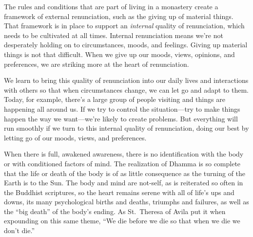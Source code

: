 The rules and conditions that are part of living in a monastery create 
a framework of external renunciation, such as the giving up of material 
things. That framework is in place to support an \emph{internal} 
quality of renunciation, which needs to be cultivated at all times. 
Internal renunciation means we're not desperately holding on to 
circumstances, moods, and feelings. Giving up material things is not 
that difficult. When we give up our moods, views, opinions, and 
preferences, we are striking more at the heart of renunciation.

We learn to bring this quality of renunciation into our daily lives and 
interactions with others so that when circumstances change, we can let 
go and adapt to them. Today, for example, there's a large group of 
people visiting and things are happening all around us. If we try to 
control the situation---try to make things happen the way we 
want---we're likely to create problems. But everything will run 
smoothly if we turn to this internal quality of renunciation, doing our 
best by letting go of our moods, views, and preferences.


When there is full, awakened awareness, there is no identification with 
the body or with conditioned factors of mind. The realization of Dhamma 
is so complete that the life or death of the body is of as little 
consequence as the turning of the Earth is to the Sun. The body and 
mind are not-self, as is reiterated so often in the Buddhist 
scriptures, so the heart remains serene with all of life's ups and 
downs, its many psychological births and deaths, triumphs and failures, 
as well as the ``big death'' of the body's ending. As St. Theresa of 
Avila put it when expounding on this same theme, ``We die before we die 
so that when we die we don't die.''

